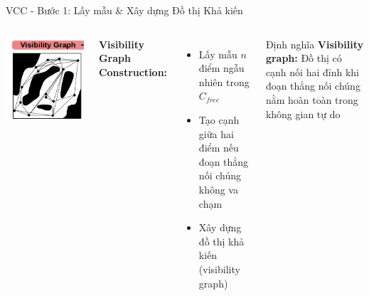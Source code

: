 \documentclass[aspectratio=169]{beamer}
\begin{document}
\begin{frame}{VCC - Bước 1: Lấy mẫu \& Xây dựng Đồ thị Khả kiến}
    \begin{columns}[c]
        \centering
        \includegraphics[width=\textwidth]{../imgs/VCC-1.png}

        \textbf{Visibility Graph Construction:}
        \begin{itemize}
            \item Lấy mẫu $n$ điểm ngẫu nhiên trong $C_{free}$
            \item Tạo cạnh giữa hai điểm nếu đoạn thẳng nối chúng không va chạm
            \item Xây dựng đồ thị khả kiến (visibility graph)
        \end{itemize}

        \vspace{0.5em}
        \begin{exampleblock}{Định nghĩa}
            \textbf{Visibility graph:} Đồ thị có cạnh nối hai đỉnh khi đoạn thẳng nối chúng nằm hoàn toàn trong không gian tự do
        \end{exampleblock}
    \end{columns}
\end{frame}
\end{document}
